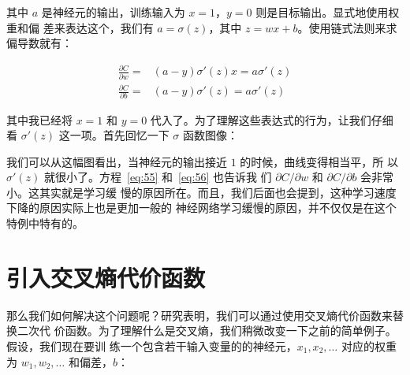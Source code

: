 其中 $a$ 是神经元的输出，训练输入为 $x=1$，$y=0$ 则是目标输出。显式地使用权重和偏
差来表达这个，我们有 $a=\sigma(z)$，其中 $z=wx+b$。使用链式法则来求偏导数就有：

\begin{align} 
  \frac{\partial C}{\partial w} = & (a-y)\sigma'(z) x = a \sigma'(z)\label{eq:55}\tag{55}\\  
  \frac{\partial C}{\partial b} = & (a-y)\sigma'(z) = a \sigma'(z)\label{eq:56}\tag{56}
\end{align}

其中我已经将 $x=1$ 和 $y=0$ 代入了。为了理解这些表达式的行为，让我们仔细
看 $\sigma'(z)$ 这一项。首先回忆一下 $\sigma$ 函数图像：
\begin{center}
\end{center}

我们可以从这幅图看出，当神经元的输出接近 $1$ 的时候，曲线变得相当平，所
以 $\sigma'(z)$ 就很小了。方程~\eqref{eq:55} 和~\eqref{eq:56} 也告诉我
们 $\partial C/\partial w$ 和 $\partial C/\partial b$ 会非常小。这其实就是学习缓
慢的原因所在。而且，我们后面也会提到，这种学习速度下降的原因实际上也是更加一般的
神经网络学习缓慢的原因，并不仅仅是在这个特例中特有的。

\section{引入交叉熵代价函数}
\label{sec:introducing_the_cross-entropy_cost_function}

那么我们如何解决这个问题呢？研究表明，我们可以通过使用交叉熵代价函数来替换二次代
价函数。为了理解什么是交叉熵，我们稍微改变一下之前的简单例子。假设，我们现在要训
练一个包含若干输入变量的的神经元，$x_1, x_2, \ldots$ 对应的权重为 $w_1, w_2,
\ldots$ 和偏差，$b$：


